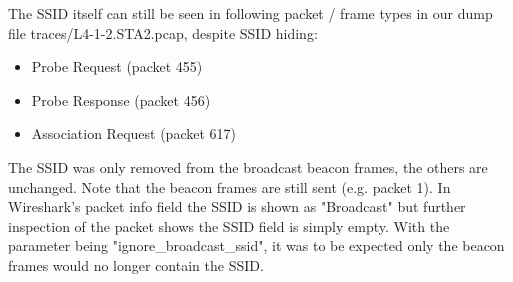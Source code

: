 The SSID itself can still be seen in following packet / frame types in our dump file traces/L4-1-2.STA2.pcap, despite SSID hiding:
\begin{itemize}
\item Probe Request (packet 455)
\item Probe Response (packet 456)
\item Association Request (packet 617)
\end{itemize}
The SSID was only removed from the broadcast beacon frames, the others are unchanged. Note that the beacon frames are still sent (e.g. packet 1). In Wireshark's packet info field the SSID is shown as "Broadcast" but further inspection of the packet shows the SSID field is simply empty.
With the parameter being "ignore\_broadcast\_ssid", it was to be expected only the beacon frames would no longer contain the SSID.
